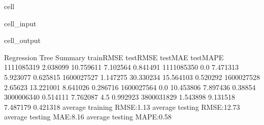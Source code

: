 \documentclass[letterpaper,10pt,english]{jupyterBook}
\begin{document}
\begin{sphinxuseclass}{cell}
\begin{sphinxVerbatimInput}
\begin{sphinxuseclass}{cell_input}
\end{sphinxuseclass}\end{sphinxVerbatimInput}
\begin{sphinxVerbatimOutput}

\begin{sphinxuseclass}{cell_output}
\begin{sphinxVerbatim}[commandchars=\\\{\}]
Regression Tree Summary
           trainRMSE   testRMSE    testMAE  testMAPE
1111085319  2.038099  10.759611   7.102564  0.841491
1111085350       0.0   7.471313   5.923077  0.625815
1600027527  1.147275  30.330234  15.564103  0.520292
1600027528   2.65623  13.221001   8.641026  0.286716
1600027564       0.0  10.453806   7.897436   0.38854
3000006340  0.514111   7.762087        4.5  0.992923
3800031829  1.543898   9.131518   7.487179  0.421318
average training RMSE:1.13
average testing RMSE:12.73
average testing MAE:8.16
average testing MAPE:0.58
\end{sphinxVerbatim}

\end{sphinxuseclass}\end{sphinxVerbatimOutput}

\end{sphinxuseclass}
\end{document}
